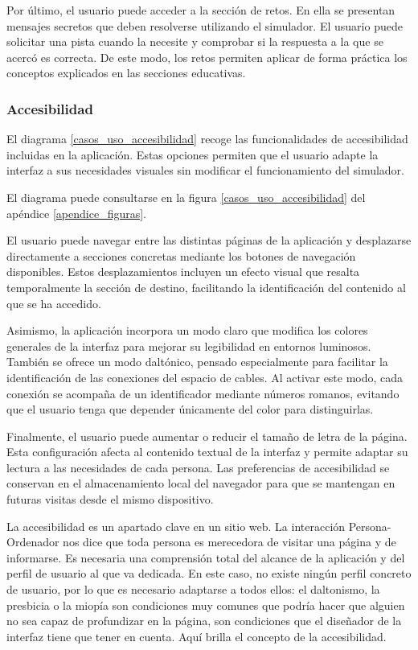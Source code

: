 Por último, el usuario puede acceder a la sección de retos. En ella se presentan mensajes secretos que deben resolverse utilizando el simulador. El usuario puede solicitar una pista cuando la necesite y comprobar si la respuesta a la que se acercó es correcta. De este modo, los retos permiten aplicar de forma práctica los conceptos explicados en las secciones educativas.

\subsubsection{Accesibilidad}

El diagrama \ref{casos_uso_accesibilidad} recoge las funcionalidades de accesibilidad incluidas en la aplicación. Estas opciones permiten que el usuario adapte la interfaz a sus necesidades visuales sin modificar el funcionamiento del simulador.

El diagrama puede consultarse en la figura \ref{casos_uso_accesibilidad} del apéndice \ref{apendice_figuras}.

El usuario puede navegar entre las distintas páginas de la aplicación y desplazarse directamente a secciones concretas mediante los botones de navegación disponibles. Estos desplazamientos incluyen un efecto visual que resalta temporalmente la sección de destino, facilitando la identificación del contenido al que se ha accedido.

Asimismo, la aplicación incorpora un modo claro que modifica los colores generales de la interfaz para mejorar su legibilidad en entornos luminosos. También se ofrece un modo daltónico, pensado especialmente para facilitar la identificación de las conexiones del espacio de cables. Al activar este modo, cada conexión se acompaña de un identificador mediante números romanos, evitando que el usuario tenga que depender únicamente del color para distinguirlas.

Finalmente, el usuario puede aumentar o reducir el tamaño de letra de la página. Esta configuración afecta al contenido textual de la interfaz y permite adaptar su lectura a las necesidades de cada persona. Las preferencias de accesibilidad se conservan en el almacenamiento local del navegador para que se mantengan en futuras visitas desde el mismo dispositivo.

La accesibilidad es un apartado clave en un sitio web. La interacción Persona-Ordenador nos dice que toda persona es merecedora de visitar una página y de informarse. Es necesaria una comprensión total del alcance de la aplicación y del perfil de usuario al que va dedicada. En este caso, no existe ningún perfil concreto de usuario, por lo que es necesario adaptarse a todos ellos: el daltonismo, la presbicia o la miopía son condiciones muy comunes que podría hacer que alguien no sea capaz de profundizar en la página, son condiciones que el diseñador de la interfaz tiene que tener en cuenta. Aquí brilla el concepto de la accesibilidad.

